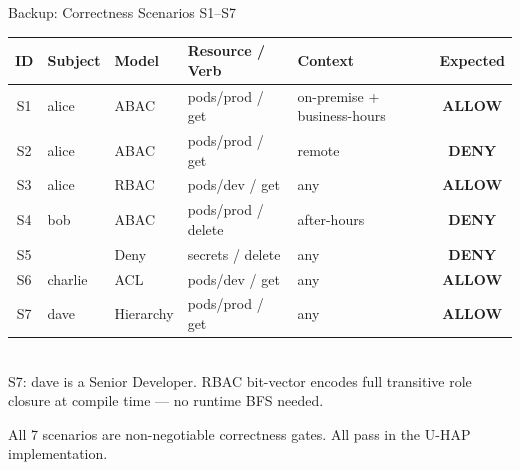 \documentclass[aspectratio=169,10pt]{beamer}
\newcommand{\highlightbanner}[1]{%
  \begin{center}
  \begin{tcolorbox}[colback=uhapGray,colframe=uhapGray,
                    boxrule=0pt,arc=1mm,
                    left=6pt,right=6pt,top=1pt,bottom=1pt,
                    width=0.97\linewidth,
                    borderline west={2pt}{0pt}{uhapTeal}]
  \tiny\color{uhapNavyD}#1
  \end{tcolorbox}
  \end{center}}
\begin{document}
\begin{frame}[t,noframenumbering]{Backup: Correctness Scenarios S1--S7}
\vspace{4pt}
\centering
\setlength{\tabcolsep}{5pt}
\renewcommand{\arraystretch}{1.3}
\begin{tabular}{c l l l l c}
\toprule
\rowcolor{uhapGray}
\tiny\textbf{ID} & \tiny\textbf{Subject} & \tiny\textbf{Model} &
\tiny\textbf{Resource / Verb} & \tiny\textbf{Context} & \tiny\textbf{Expected} \\
\midrule
\tiny S1 & \tiny alice   & \tiny ABAC      & \tiny pods/prod / get    & \tiny on-premise + business-hours & \tiny\bfseries\color{uhapGreen}ALLOW \\
\tiny S2 & \tiny alice   & \tiny ABAC      & \tiny pods/prod / get    & \tiny remote                      & \tiny\bfseries\color{uhapRed}DENY \\
\tiny S3 & \tiny alice   & \tiny RBAC      & \tiny pods/dev / get     & \tiny any                         & \tiny\bfseries\color{uhapGreen}ALLOW \\
\tiny S4 & \tiny bob     & \tiny ABAC      & \tiny pods/prod / delete & \tiny after-hours                 & \tiny\bfseries\color{uhapRed}DENY \\
\tiny S5 & \tiny *       & \tiny Deny      & \tiny secrets / delete   & \tiny any                         & \tiny\bfseries\color{uhapRed}DENY \\
\tiny S6 & \tiny charlie & \tiny ACL       & \tiny pods/dev / get     & \tiny any                         & \tiny\bfseries\color{uhapGreen}ALLOW \\
\tiny S7 & \tiny dave    & \tiny Hierarchy & \tiny pods/prod / get    & \tiny any                         & \tiny\bfseries\color{uhapGreen}ALLOW \\
\bottomrule
\end{tabular}\\[5pt]
{\tiny\color{uhapGrayD}S7: dave is a Senior Developer. RBAC bit-vector encodes full transitive role closure at compile time --- no runtime BFS needed.}\\[4pt]
\highlightbanner{All 7 scenarios are non-negotiable correctness gates. All pass in the U-HAP implementation.}
\end{frame}
\end{document}

